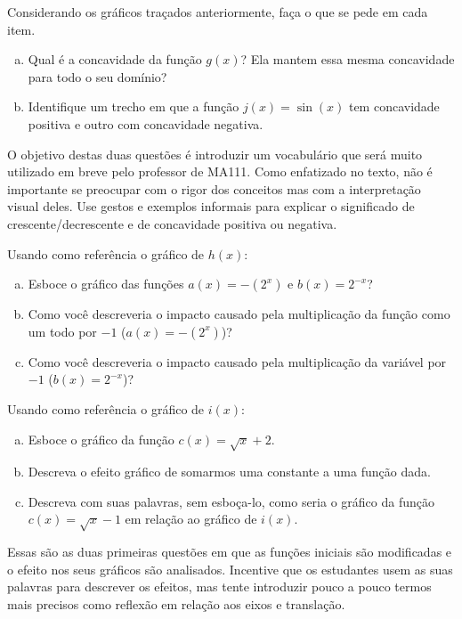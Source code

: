 \documentclass[main_estudante.tex]{subfiles}
\begin{document}
\begin{questao}
Considerando os gráficos traçados anteriormente, faça o que se pede em cada item.
\begin{enumerate}[a)]
\item Qual é a concavidade da função $g(x)$? Ela mantem essa mesma concavidade para todo o seu domínio?
\item Identifique um trecho em que a função $j(x)=\sin(x)$ tem concavidade positiva e outro com concavidade negativa.
\end{enumerate}
\end{questao}

O objetivo destas duas questões é introduzir um vocabulário que será muito utilizado em breve pelo professor de MA111. Como enfatizado no texto, não é importante se preocupar com o rigor dos conceitos mas com a interpretação visual deles. Use gestos e exemplos informais para explicar o significado de crescente/decrescente e de concavidade positiva ou negativa.

\begin{questao}
Usando como referência o gráfico de $h(x)$:
\begin{enumerate}[a)]
\item Esboce o gráfico das funções $a(x)=-(2^x)$ e $b(x)=2^{-x}$?
\item Como você descreveria o impacto causado pela multiplicação da função como um todo por $-1$ ($a(x)=-(2^x)$)?
\item Como você descreveria o impacto causado pela multiplicação da variável por $-1$ ($b(x)=2^{-x}$)?
\end{enumerate}
\end{questao}

\begin{questao}
Usando como referência o gráfico de $i(x)$:
\begin{enumerate}[a)]
\item Esboce o gráfico da função $c(x)=\sqrt{x}+2$.
\item Descreva o efeito gráfico de somarmos uma constante a uma função dada.
\item Descreva com suas palavras, sem esboça-lo, como seria o gráfico da função $c(x)=\sqrt{x}-1$ em relação ao gráfico de $i(x)$.
\end{enumerate}
\end{questao}

Essas são as duas primeiras questões em que as funções iniciais são modificadas e o efeito nos seus gráficos são analisados. Incentive que os estudantes usem as suas palavras para descrever os efeitos, mas tente introduzir pouco a pouco termos mais precisos como reflexão em relação aos eixos e translação.
\end{document}

